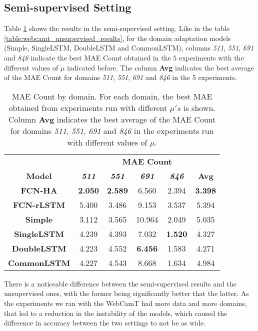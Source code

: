\subsection{Semi-supervised Setting}

Table \ref{table:webcamt_semi-supervised_results} shows the results in the semi-supervised setting. Like in the table \ref{table:webcamt_unsupervised_results}, for the domain adaptation models (Simple, SingleLSTM, DoubleLSTM and CommonLSTM), columns \textit{511}, \textit{551}, \textit{691} and \textit{846} indicate the best MAE Count obtained in the $5$ experiments with the different values of $\mu$ indicated before. The column \textbf{Avg} indicates the best average of the MAE Count for domains \textit{511}, \textit{551}, \textit{691} and \textit{846} in the 5 experiments.

\begin{table}[!ht]
	\centering
	\begin{tabular}{| c | c | c | c | c | c |}
		\cline{2-6}
		\multicolumn{1}{c|}{} & \multicolumn{5}{c|}{\textbf{MAE Count}} \\
		\cline{1-6}
		\textbf{Model} & \textbf{\textit{511}} & \textbf{\textit{551}} & \textbf{\textit{691}} & \textbf{\textit{846}} & \textbf{Avg}\\
		\hline
		\textbf{FCN-HA} & \textbf{2.050} & \textbf{2.589} & 6.560 & 2.394 & \textbf{3.398} \\
		\hline
		\textbf{FCN-rLSTM} & 5.400 & 3.486 & 9.153 & 3.537 &  5.394 \\
		\hline
		\textbf{Simple} & 3.112 & 3.565 & 10.964 & 2.049 & 5.035 \\
		\hline 
		\textbf{SingleLSTM} & 4.239 & 4.393 & 7.032 & \textbf{1.520} & 4.327 \\
		\hline
		\textbf{DoubleLSTM} & 4.223 & 4.552 & \textbf{6.456} & 1.583 & 4.271 \\ 
		\hline
		\textbf{CommonLSTM} & 4.227 & 4.543 & 8.668 & 1.634 & 4.984 \\
		\hline
	\end{tabular}
	\caption{MAE Count by domain. For each domain, the best MAE obtained from experiments run with different $\mu's$ is shown. Column \textbf{Avg} indicates the best average of the MAE Count for domains \textit{511}, \textit{551}, \textit{691} and \textit{846} in the experiments run with different values of $\mu$.}
	\label{table:webcamt_semi-supervised_results}
\end{table}

There is a noticeable difference between the semi-supervised results and the unsupervised ones, with the former being significantly better that the latter. As the experiments we ran with the WebCamT had more data and more domains, that led to a reduction in the instability of the models, which caused the difference in accuracy between the two settings to not be as wide.

